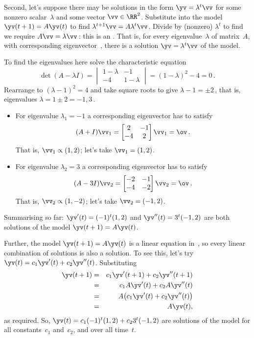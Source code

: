 \begin{example}
\begin{solution}
Second, let's suppose there may be solutions in the form \(\yv=\lambda^t\vv\) for some nonzero scalar~\(\lambda\) and some vector \(\vv\in\RR^2\).
Substitute into the model \(\yv(t+1)=A\yv(t)\) to find \(\lambda^{t+1}\vv=A\lambda^t\vv\). 
Divide by (nonzero) \(\lambda^t\) to find we require \(A\vv=\lambda\vv\)\,: this is an .
That is, for every eigenvalue~\(\lambda\) of matrix~\(A\), with corresponding eigenvector~\vv, there is a solution \(\yv=\lambda^t\vv\) of the model.

To find the eigenvalues here solve the characteristic equation 
\begin{equation*}
\det(A-\lambda I)=\begin{vmatrix} 1-\lambda&-1\\-4&1-\lambda \end{vmatrix}=(1-\lambda)^2-4=0\,.
\end{equation*}
Rearrange to \((\lambda-1)^2=4\) and take square roots to give \(\lambda-1=\pm2\)\,, that is, eigenvalues \(\lambda=1\pm2=-1,3\)\,.
\begin{itemize}
\item For eigenvalue \(\lambda_1=-1\) a corresponding eigenvector has to satisfy
\begin{equation*}
(A+I)\vv_1=\begin{bmatrix} 2&-1\\-4&2 \end{bmatrix}\vv_1=\ov\,.
\end{equation*}
That is, \(\vv_1\propto (1,2)\); let's take \(\vv_1=(1,2)\).

\item For eigenvalue \(\lambda_2=3\) a corresponding eigenvector has to satisfy
\begin{equation*}
(A-3I)\vv_2=\begin{bmatrix} -2&-1\\-4&-2 \end{bmatrix}\vv_2=\ov\,.
\end{equation*}
That is, \(\vv_2\propto (1,-2)\); let's take \(\vv_2=(-1,2)\).
\end{itemize}
Summarising so far: \(\yv'(t)=(-1)^t(1,2)\) and \(\yv''(t)=3^t(-1,2)\) are both solutions of the model \(\yv(t+1)=A\yv(t)\).

Further, the model \(\yv(t+1)=A\yv(t)\) is a linear equation in~\yv, so every linear combination of solutions is also a solution.
To see this, let's try \(\yv(t)=c_1\yv'(t)+c_2\yv''(t)\).
Substituting
\begin{eqnarray*}
\yv(t+1)&=&c_1\yv'(t+1)+c_2\yv''(t+1)
\\&=&c_1A\yv'(t)+c_2A\yv''(t)
\\&=&A\big(c_1\yv'(t)+c_2\yv''(t)\big)
\\&=&A\yv(t),
\end{eqnarray*}
as required.
So, \(\yv(t)=c_1(-1)^t(1,2)+c_23^t(-1,2)\) are solutions of the model for all constants~\(c_1\) and~\(c_2\), and over all time~\(t\).


\end{solution}
\end{example}
